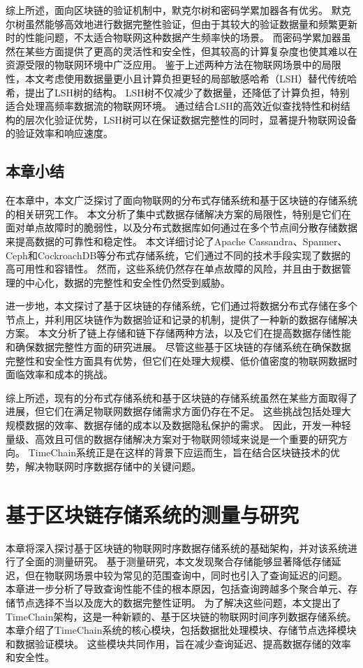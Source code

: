 综上所述，面向区块链的验证机制中，默克尔树和密码学累加器各有优劣。
默克尔树虽然能够高效地进行数据完整性验证，但由于其较大的验证数据量和频繁更新时的性能问题，不太适合物联网这种数据产生频率快的场景。
而密码学累加器虽然在某些方面提供了更高的灵活性和安全性，但其较高的计算复杂度也使其难以在资源受限的物联网环境中广泛应用。
鉴于上述两种方法在物联网场景中的局限性，本文考虑使用数据量更小且计算负担更轻的局部敏感哈希（LSH）替代传统哈希，提出了LSH树的结构。
LSH树不仅减少了数据量，还降低了计算负担，特别适合处理高频率数据流的物联网环境。
通过结合LSH的高效近似查找特性和树结构的层次化验证优势，LSH树可以在保证数据完整性的同时，显著提升物联网设备的验证效率和响应速度。

\section{本章小结}
在本章中，本文广泛探讨了面向物联网的分布式存储系统和基于区块链的存储系统的相关研究工作。
本文分析了集中式数据存储解决方案的局限性，特别是它们在面对单点故障时的脆弱性，以及分布式数据库如何通过在多个节点间分散存储数据来提高数据的可靠性和稳定性。
本文详细讨论了Apache Cassandra、Spanner、Ceph和CockroachDB等分布式存储系统，它们通过不同的技术手段实现了数据的高可用性和容错性。
然而，这些系统仍然存在单点故障的风险，并且由于数据管理的中心化，数据的完整性和安全性仍然受到威胁。

进一步地，本文探讨了基于区块链的存储系统，它们通过将数据分布式存储在多个节点上，并利用区块链作为数据验证和记录的机制，提供了一种新的数据存储解决方案。
本文分析了链上存储和链下存储两种方法，以及它们在提高数据存储性能和确保数据完整性方面的研究进展。
尽管这些基于区块链的存储系统在确保数据完整性和安全性方面具有优势，但它们在处理大规模、低价值密度的物联网数据时面临效率和成本的挑战。

综上所述，现有的分布式存储系统和基于区块链的存储系统虽然在某些方面取得了进展，但它们在满足物联网数据存储需求方面仍存在不足。
这些挑战包括处理大规模数据的效率、数据存储的成本以及数据隐私保护的需求。
因此，开发一种轻量级、高效且可信的数据存储解决方案对于物联网领域来说是一个重要的研究方向。
TimeChain系统正是在这样的背景下应运而生，旨在结合区块链技术的优势，解决物联网时序数据存储中的关键问题。

\chapter{基于区块链存储系统的测量与研究}
\label{sec:baseline}
本章将深入探讨基于区块链的物联网时序数据存储系统的基础架构，并对该系统进行了全面的测量研究。
基于测量研究，本文发现聚合存储能够显著降低存储延迟，但在物联网场景中较为常见的范围查询中，同时也引入了查询延迟的问题。
本章进一步分析了导致查询性能不佳的根本原因，包括查询跨越多个聚合单元、存储节点选择不当以及庞大的数据完整性证明。
为了解决这些问题，本文提出了TimeChain架构，这是一种新颖的、基于区块链的物联网时间序列数据存储系统。
本章介绍了TimeChain系统的核心模块，包括数据批处理模块、存储节点选择模块和数据验证模块。
这些模块共同作用，旨在减少查询延迟、提高数据存储的效率和安全性。

